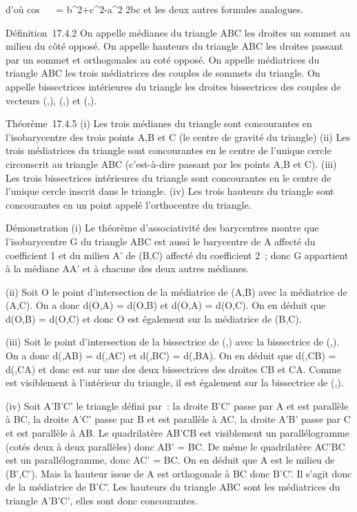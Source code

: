 \documentclass[]{article}
\begin{document}
d'où cos~ \alpha~ =
b^2+c^2-a^2 \over 2bc
et les deux autres formules analogues.

Définition~17.4.2 On appelle médianes du triangle ABC les droites
\jmathoignant un sommet au milieu du côté opposé. On appelle hauteurs du
triangle ABC les droites passant par un sommet et orthogonales au coté
opposé. On appelle médiatrices du triangle ABC les trois médiatrices des
couples de sommets du triangle. On appelle bissectrices intérieures du
triangle les droites bissectrices des couples de vecteurs
(\overrightarrowAB,\overrightarrowAC),
(\overrightarrowBC,\overrightarrowBA)
et
(\overrightarrowCA,\overrightarrowCB).

Théorème~17.4.5 (i) Les trois médianes du triangle sont concourantes en
l'isobarycentre des trois points A,B et C (le centre de gravité du
triangle) (ii) Les trois médiatrices du triangle sont concourantes en le
centre de l'unique cercle circonscrit au triangle ABC (c'est-à-dire
passant par les points A,B et C). (iii) Les trois bissectrices
intérieures du triangle sont concourantes en le centre de l'unique
cercle inscrit dans le triangle. (iv) Les trois hauteurs du triangle
sont concourantes en un point appelé l'orthocentre du triangle.

Démonstration (i) Le théorème d'associativité des barycentres montre que
l'isobarycentre G du triangle ABC est aussi le barycentre de A affecté
du coefficient 1 et du milieu A' de (B,C) affecté du coefficient 2~;
donc G appartient à la médiane AA' et à chacune des deux autres
médianes.

(ii) Soit O le point d'intersection de la médiatrice de (A,B) avec la
médiatrice de (A,C). On a donc d(O,A) = d(O,B) et d(O,A) = d(O,C). On en
déduit que d(O,B) = d(O,C) et donc O est également sur la médiatrice de
(B,C).

(iii) Soit \Omega le point d'intersection de la bissectrice de
(\overrightarrowAB,\overrightarrowAC)
avec la bissectrice de
(\overrightarrowBC,\overrightarrowBA).
On a donc d(\Omega,AB) = d(\Omega,AC) et d(\Omega,BC) = d(\Omega,BA). On en déduit que
d(\Omega,CB) = d(\Omega,CA) et donc \Omega est sur une des deux bissectrices des
droites CB et CA. Comme \Omega est visiblement à l'intérieur du triangle, il
est également sur la bissectrice de
(\overrightarrowCA,\overrightarrowCB).

(iv) Soit A'B'C' le triangle défini par~: la droite B'C' passe par A et
est parallèle à BC, la droite A'C' passe par B et est parallèle à AC, la
droite A'B' passe par C et est parallèle à AB. Le quadrilatère AB'CB est
visiblement un parallélogramme (cotés deux à deux parallèles) donc AB' =
BC. De même le quadrilatère AC'BC est un parallélogramme, donc AC' = BC.
On en déduit que A est le milieu de (B',C'). Mais la hauteur issue de A
est orthogonale à BC donc B'C'. Il s'agit donc de la médiatrice de B'C'.
Les hauteurs du triangle ABC sont les médiatrices du triangle A'B'C',
elles sont donc concourantes.
\end{document}
